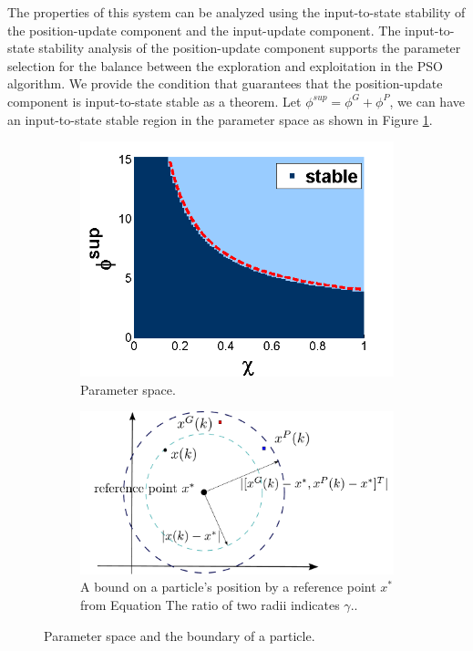 \documentclass[phd]{byuprop}
\begin{document}
The properties of this system can be analyzed using the input-to-state stability of the position-update component and the input-update component. 
The input-to-state stability analysis of the position-update component supports the parameter selection for the balance between the exploration and exploitation in the PSO algorithm.
We provide the condition that guarantees that the position-update component is input-to-state stable as a theorem.
Let $ \phi^{sup}  = \phi^{G} + \phi^{P} $, we can have an input-to-state stable region in the parameter space as shown in Figure \ref{fig:paramSpace}.

\begin{figure}[htbp]
	\centering
	\begin{subfigure}[t]{0.4\linewidth}
		\centering
		\includegraphics[width=\textwidth]{./fig/param2.png}
		\caption{Parameter space.}
		\label{fig:paramSpace}
	\end{subfigure}  
	\begin{subfigure}[t]{0.55\linewidth}
		\centering
		\includegraphics[width=\textwidth]{./fig/boundary}
		\caption{A bound on a particle's position by a reference point $ x^{*} $ from Equation %
		The ratio of two radii indicates $ \gamma $..}
		\label{fig:boundary}
	\end{subfigure}   
	\caption{Parameter space and the boundary of a particle.}
	\label{fig:particle:param_bound}
\end{figure}
\end{document}
